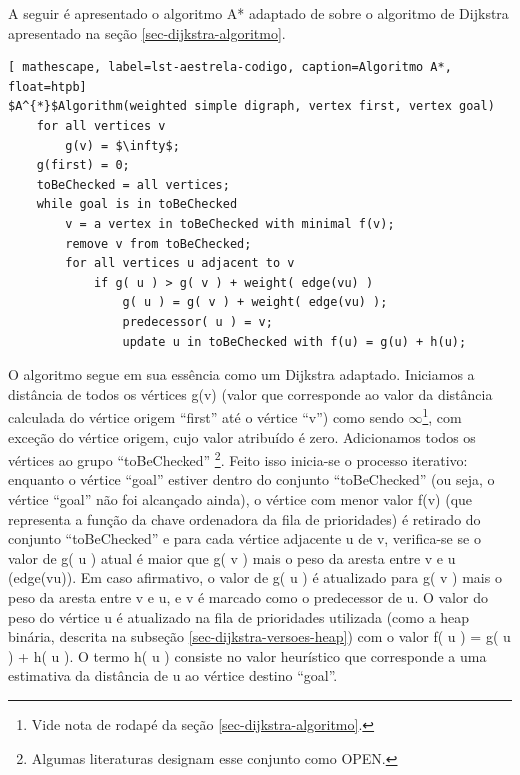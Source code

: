 A seguir é apresentado o algoritmo A* adaptado de  sobre o algoritmo de Dijkstra apresentado na seção \ref{sec-dijkstra-algoritmo}. 

\begin{lstlisting}[ mathescape, label=lst-aestrela-codigo, caption=Algoritmo A*, float=htpb]
$A^{*}$Algorithm(weighted simple digraph, vertex first, vertex goal)
	for all vertices v
		g(v) = $\infty$;
	g(first) = 0;
	toBeChecked = all vertices;
	while goal is in toBeChecked
		v = a vertex in toBeChecked with minimal f(v);
		remove v from toBeChecked;
		for all vertices u adjacent to v
			if g( u ) > g( v ) + weight( edge(vu) )
				g( u ) = g( v ) + weight( edge(vu) );
				predecessor( u ) = v;
				update u in toBeChecked with f(u) = g(u) + h(u);
\end{lstlisting}

O algoritmo segue em sua essência como um Dijkstra adaptado. Iniciamos a distância de todos os vértices g(v) (valor que corresponde ao valor da distância calculada do vértice origem ``first'' até o vértice ``v'') como sendo $\infty$\footnote{Vide nota de rodapé da seção \ref{sec-dijkstra-algoritmo}.}, com exceção do vértice origem, cujo valor atribuído é zero. Adicionamos todos os vértices ao grupo ``toBeChecked'' \footnote{Algumas literaturas designam esse conjunto como OPEN.}. Feito isso inicia-se o processo iterativo: enquanto o vértice ``goal'' estiver dentro do conjunto ``toBeChecked'' (ou seja, o vértice ``goal'' não foi alcançado ainda), o vértice com menor valor f(v) (que representa a função da chave ordenadora da fila de prioridades) é retirado do conjunto ``toBeChecked'' e para cada vértice adjacente u de v, verifica-se se o valor de g( u ) atual é maior que g( v ) mais o peso da aresta entre v e u (edge(vu)). Em caso afirmativo, o valor de g( u ) é atualizado para g( v ) mais o peso da aresta entre v e u, e v é marcado como o predecessor de u. O valor do peso do vértice u é atualizado na fila de prioridades utilizada (como a heap binária, descrita na subseção \ref{sec-dijkstra-versoes-heap}) com o valor f( u ) = g( u ) + h( u ). O termo h( u ) consiste no valor heurístico que corresponde a uma estimativa da distância de u ao vértice destino ``goal''.

